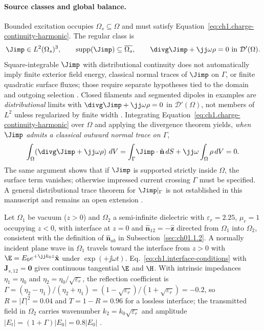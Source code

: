 \paragraph{Source classes and global balance.}
Bounded excitation occupies $\Omega_s\subseteq\Omega$ and must satisfy Equation~\eqref{eq:ch1.charge-continuity-harmonic}. The regular class is
\begin{equation}
\label{eq:ch1.source-charge-continuous}
\Jimp\in L^2(\Omega_s)^3,\qquad
\operatorname{supp}(\Jimp)\subseteq\overline{\Omega_s},\qquad
\divg\Jimp+\jj\omega\rho=0
\ \text{in }\mathcal{D}'(\Omega).
\end{equation}
Square-integrable $\Jimp$ with distributional continuity does not automatically imply finite exterior field energy, classical normal traces of $\Jimp$ on $\Gamma$, or finite quadratic surface fluxes; those require separate hypotheses tied to the domain and outgoing selection \cite{stratton1941}. Closed filaments and segmented dipoles in examples are \emph{distributional} limits with $\divg\Jimp+\jj\omega\rho=0$ in $\mathcal{D}'(\Omega)$, not members of $L^2$ unless regularized by finite width \cite{stratton1941,jackson1999}. Integrating Equation~\eqref{eq:ch1.charge-continuity-harmonic} over $\Omega$ and applying the divergence theorem yields, \emph{when $\Jimp$ admits a classical outward normal trace on $\Gamma$},
\begin{equation}
\label{eq:ch1.global-charge-compatibility}
\int_{\Omega}\!\left(\divg\Jimp+\jj\omega\rho\right)\,dV
=\int_{\Gamma}\!\Jimp\cdot\hat{\mathbf{n}}\,dS+\jj\omega\int_{\Omega}\rho\,dV=0.
\end{equation}
The same argument shows that if $\Jimp$ is supported strictly inside $\Omega$, the surface term vanishes; otherwise impressed current crossing $\Gamma$ must be specified. A general distributional trace theorem for $\Jimp|_\Gamma$ is not established in this manuscript and remains an open extension \cite{maxwell1873,stratton1941}.

\label{prop:ch1.source-boundary-compatibility}
\begin{example}
\label{ex:ch1.dielectric-interface}
Let $\Omega_1$ be vacuum ($z>0$) and $\Omega_2$ a semi-infinite dielectric with $\varepsilon_r=2.25$, $\mu_r=1$ occupying $z<0$, with interface at $z=0$ and $\hat{\mathbf{n}}_{12}=-\hat{\mathbf{z}}$ directed from $\Omega_1$ into $\Omega_2$, consistent with the definition of $\hat{\mathbf{n}}_{ab}$ in Subsection~\ref{sec:ch01.1.2}. A normally incident plane wave in $\Omega_1$ travels toward the interface from $z>0$ with $\E=E_0 e^{+\jj k_0 z}\hat{\mathbf{x}}$ under $\exp(+\jj\omega t)$. Eq.~\eqref{eq:ch1.interface-conditions} with $\mathbf{J}_{s,12}=\mathbf{0}$ gives continuous tangential $\E$ and $\H$. With intrinsic impedances $\eta_1=\eta_0$ and $\eta_2=\eta_0/\sqrt{\varepsilon_r}$, the reflection coefficient is $\Gamma=(\eta_2-\eta_1)/(\eta_2+\eta_1)=(1-\sqrt{\varepsilon_r})/(1+\sqrt{\varepsilon_r})=-0.2$, so $R=|\Gamma|^2=0.04$ and $T=1-R=0.96$ for a lossless interface; the transmitted field in $\Omega_2$ carries wavenumber $k_2=k_0\sqrt{\varepsilon_r}$ and amplitude $|E_t|=(1+\Gamma)|E_0|=0.8|E_0|$ \cite{stratton1941,jackson1999}.
\end{example}

